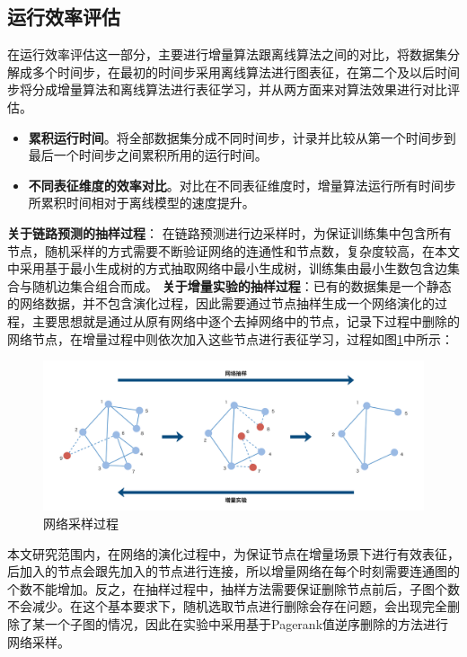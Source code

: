 \subsection{运行效率评估}
在运行效率评估这一部分，主要进行增量算法跟离线算法之间的对比，将数据集分解成多个时间步，在最初的时间步采用离线算法进行图表征，在第二个及以后时间步将分成增量算法和离线算法进行表征学习，并从两方面来对算法效果进行对比评估。
\begin{itemize}
	\item \textbf{累积运行时间}。将全部数据集分成不同时间步，计录并比较从第一个时间步到最后一个时间步之间累积所用的运行时间。
	\item \textbf{不同表征维度的效率对比}。对比在不同表征维度时，增量算法运行所有时间步所累积时间相对于离线模型的速度提升。 
\end{itemize}
\remark \textbf{关于链路预测的抽样过程}：
在链路预测进行边采样时，为保证训练集中包含所有节点，随机采样的方式需要不断验证网络的连通性和节点数，复杂度较高，在本文中采用基于最小生成树的方式抽取网络中最小生成树，训练集由最小生数包含边集合与随机边集合组合而成。
\remark \textbf{关于增量实验的抽样过程}：已有的数据集是一个静态的网络数据，并不包含演化过程，因此需要通过节点抽样生成一个网络演化的过程，主要思想就是通过从原有网络中逐个去掉网络中的节点，记录下过程中删除的网络节点，在增量过程中则依次加入这些节点进行表征学习，过程如图\ref{fig:network_sample}中所示：
\begin{figure}
	\centering
	\includegraphics[width=6.2in]{figures/inc_sample}
	\caption{网络采样过程}
	\label{fig:network_sample}
\end{figure}


本文研究范围内，在网络的演化过程中，为保证节点在增量场景下进行有效表征，后加入的节点会跟先加入的节点进行连接，所以增量网络在每个时刻需要连通图的个数不能增加。反之，在抽样过程中，抽样方法需要保证删除节点前后，子图个数不会减少。在这个基本要求下，随机选取节点进行删除会存在问题，会出现完全删除了某一个子图的情况，因此在实验中采用基于Pagerank值\cite{page1999pagerank}逆序删除的方法进行网络采样。



